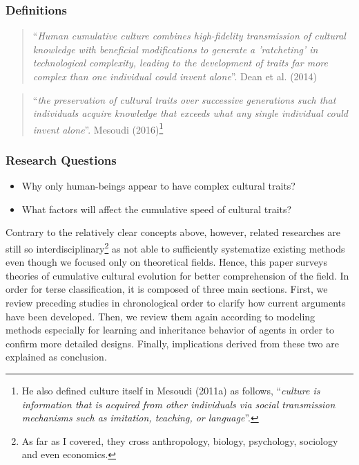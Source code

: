 \documentclass[a4paper, dvipdfmx]{article}
\begin{document}
\subsubsection*{Definitions}
\begin{quotation}
    “{\it Human cumulative culture combines high-fidelity transmission of cultural knowledge with beneficial modifications to generate a 'ratcheting' in technological complexity, leading to the development of traits far more complex than one individual could invent alone}”. Dean et al. (2014)
\end{quotation}
\begin{quotation}
    “{\it the preservation of cultural traits over successive generations such that individuals acquire knowledge that exceeds what any single individual could invent alone}”. Mesoudi (2016)\footnote{He also defined culture itself in Mesoudi (2011a) as follows, “{\it culture is information that is acquired from other individuals via social transmission mechanisms such as imitation, teaching, or language}”.}
\end{quotation}

\subsubsection*{Research Questions}

\begin{itemize}
    \item Why only human-beings appear to have complex cultural traits?
    \item What factors will affect the cumulative speed of cultural traits?
\end{itemize}
Contrary to the relatively clear concepts above, however, related researches are still so interdisciplinary\footnote{As far as I covered, they cross anthropology, biology, psychology, sociology and even economics.} as not able to sufficiently systematize existing methods even though we focused only on theoretical fields. Hence, this paper surveys theories of cumulative cultural evolution for better comprehension of the field. In order for terse classification, it is composed of three main sections. First, we review preceding studies in chronological order to clarify how current arguments have been developed. Then, we review them again according to modeling methods especially for learning and inheritance behavior of agents in order to confirm more detailed designs. Finally, implications derived from these two are explained as conclusion.
\end{document}

